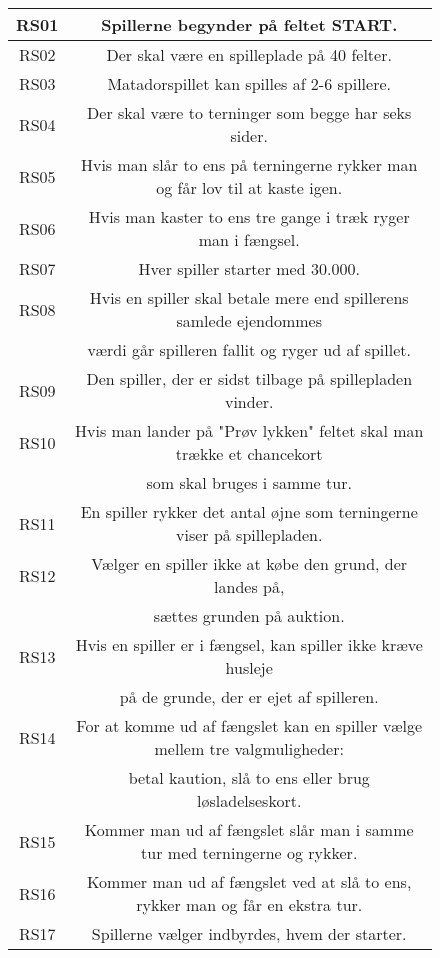 \begin{flushleft}
\end{flushleft}
\begin{figure}[H]
    \centering
\begin{tabular}{ | c | c | } 
\hline
RS01 & Spillerne begynder på feltet START. \\ 
\hline
RS02 & Der skal være en spilleplade på 40 felter. \\ 
\hline
RS03 & Matadorspillet kan spilles af 2-6 spillere. \\ 
\hline
RS04 & Der skal være to terninger som begge har seks sider. \\ 
\hline
RS05 & Hvis man slår to ens på terningerne rykker man og får lov til at kaste igen. \\
\hline
RS06 & Hvis man kaster to ens tre gange i træk ryger man i fængsel. \\ 
\hline
RS07 & Hver spiller starter med 30.000. \\ 
\hline
RS08 & Hvis en spiller skal betale mere end spillerens samlede ejendommes\\ & værdi går spilleren fallit og ryger ud af spillet. \\ 
\hline
RS09 & Den spiller, der er sidst tilbage på spillepladen vinder. \\ 
\hline
RS10 & Hvis man lander på "Prøv lykken" feltet skal man trække et chancekort\\
& som skal bruges i samme tur. \\ 
\hline
RS11 & En spiller rykker det antal øjne som terningerne viser på spillepladen.\\ 
\hline
RS12 & Vælger en spiller ikke at købe den grund, der landes på, \\
& sættes grunden på auktion.\\ 
\hline
RS13 & Hvis en spiller er i fængsel, kan spiller ikke kræve husleje\\
& på de grunde, der er ejet af spilleren.\\
\hline
RS14 & For at komme ud af fængslet kan en spiller vælge mellem tre valgmuligheder:\\
& betal kaution, slå to ens eller brug løsladelseskort. \\ 
\hline
RS15 & Kommer man ud af fængslet slår man  i samme tur med terningerne og rykker. \\ 
\hline
RS16 & Kommer man ud af fængslet ved at slå to ens, rykker man og får en ekstra tur. \\ 
\hline
RS17 & Spillerne vælger indbyrdes, hvem der starter. \\ 

\end{tabular}
\end{figure}
